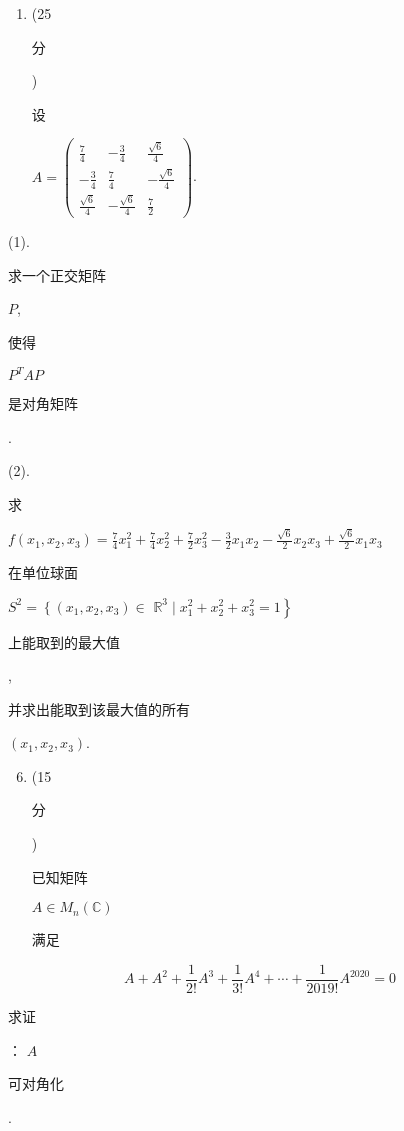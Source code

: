 \documentclass[10pt]{article}
\begin{document}
\begin{enumerate}
  \item (25 \begin{CJK}{UTF8}{mj}分\end{CJK}) \begin{CJK}{UTF8}{mj}设\end{CJK} $A=\left(\begin{array}{ccc}\frac{7}{4} & -\frac{3}{4} & \frac{\sqrt{6}}{4} \\ -\frac{3}{4} & \frac{7}{4} & -\frac{\sqrt{6}}{4} \\ \frac{\sqrt{6}}{4} & -\frac{\sqrt{6}}{4} & \frac{7}{2}\end{array}\right)$.

\end{enumerate}
(1). \begin{CJK}{UTF8}{mj}求一个正交矩阵\end{CJK} $P$, \begin{CJK}{UTF8}{mj}使得\end{CJK} $P^{T} A P$ \begin{CJK}{UTF8}{mj}是对角矩阵\end{CJK}.

(2). \begin{CJK}{UTF8}{mj}求\end{CJK} $f\left(x_{1}, x_{2}, x_{3}\right)=\frac{7}{4} x_{1}^{2}+\frac{7}{4} x_{2}^{2}+\frac{7}{2} x_{3}^{2}-\frac{3}{2} x_{1} x_{2}-\frac{\sqrt{6}}{2} x_{2} x_{3}+\frac{\sqrt{6}}{2} x_{1} x_{3}$ \begin{CJK}{UTF8}{mj}在单位球面\end{CJK} $S^{2}=\left\{\left(x_{1}, x_{2}, x_{3}\right) \in\right.$ $\left.\mathbb{R}^{3} \mid x_{1}^{2}+x_{2}^{2}+x_{3}^{2}=1\right\}$ \begin{CJK}{UTF8}{mj}上能取到的最大值\end{CJK}, \begin{CJK}{UTF8}{mj}并求出能取到该最大值的所有\end{CJK} $\left(x_{1}, x_{2}, x_{3}\right)$.

\begin{enumerate}
  \setcounter{enumi}{5}
  \item (15 \begin{CJK}{UTF8}{mj}分\end{CJK}) \begin{CJK}{UTF8}{mj}已知矩阵\end{CJK} $A \in M_{n}(\mathbb{C})$ \begin{CJK}{UTF8}{mj}满足\end{CJK}
\end{enumerate}
$$
A+A^{2}+\frac{1}{2 !} A^{3}+\frac{1}{3 !} A^{4}+\cdots+\frac{1}{2019 !} A^{2020}=0
$$
\begin{CJK}{UTF8}{mj}求证\end{CJK}： $A$ \begin{CJK}{UTF8}{mj}可对角化\end{CJK}.
\end{document}
